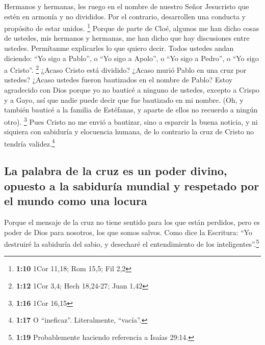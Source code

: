  Hermanos y hermanas, les ruego en el nombre de nuestro
Señor Jesucristo que estén en armonía y no divididos. Por el contrario,
desarrollen una conducta y propósito de estar unidos. \footnote{\textbf{1:10}
  1Cor 11,18; Rom 15,5; Fil 2,2}  Porque de parte de
Cloé, algunos me han dicho cosas de ustedes, mis hermanos y hermanas, me
han dicho que hay discusiones entre ustedes.  Permítanme
explicarles lo que quiero decir. Todos ustedes andan diciendo: ``Yo sigo
a Pablo'', o ``Yo sigo a Apolo'', o ``Yo sigo a Pedro'', o ``Yo sigo a
Cristo''. \footnote{\textbf{1:12} 1Cor 3,4; Hech 18,24-27; Juan 1,42}
 ¿Acaso Cristo está dividido? ¿Acaso murió Pablo en una
cruz por ustedes? ¿Acaso ustedes fueron bautizados en el nombre de
Pablo?  Estoy agradecido con Dios porque yo no bauticé a
ninguno de ustedes, excepto a Crispo y a Gayo,  así que
nadie puede decir que fue bautizado en mi nombre.  (Oh, y
también bauticé a la familia de Estéfanas, y aparte de ellos no recuerdo
a ningún otro). \footnote{\textbf{1:16} 1Cor 16,15}  Pues
Cristo no me envió a bautizar, sino a esparcir la buena noticia, y ni
siquiera con sabiduría y elocuencia humana, de lo contrario la cruz de
Cristo no tendría validez.\footnote{\textbf{1:17} O ``ineficaz''.
  Literalmente, ``vacía''.}

\hypertarget{la-palabra-de-la-cruz-es-un-poder-divino-opuesto-a-la-sabiduruxeda-mundial-y-respetado-por-el-mundo-como-una-locura}{%
\subsection{La palabra de la cruz es un poder divino, opuesto a la
sabiduría mundial y respetado por el mundo como una
locura}\label{la-palabra-de-la-cruz-es-un-poder-divino-opuesto-a-la-sabiduruxeda-mundial-y-respetado-por-el-mundo-como-una-locura}}

 Porque el mensaje de la cruz no tiene sentido para los
que están perdidos, pero es poder de Dios para nosotros, los que somos
salvos.  Como dice la Escritura: ``Yo destruiré la
sabiduría del sabio, y desecharé el entendimiento de los
inteligentes''.\footnote{\textbf{1:19} Probablemente haciendo referencia
  a Isaías 29:14.}

